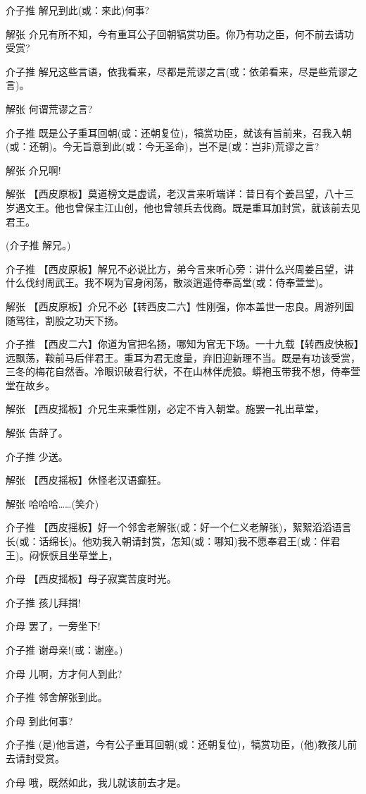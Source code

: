 介子推 解兄到此(或：来此)何事?

解张
介兄有所不知，今有重耳公子回朝犒赏功臣。你乃有功之臣，何不前去请功受赏?

介子推
解兄这些言语，依我看来，尽都是荒谬之言(或：依弟看来，尽是些荒谬之言)。

解张 何谓荒谬之言?

介子推
既是公子重耳回朝(或：还朝复位)，犒赏功臣，就该有旨前来，召我入朝(或：还朝)。今无旨意到此(或：今无圣命)，岂不是(或：岂非)荒谬之言?

解张 介兄啊!

解张
【西皮原板】莫道榜文是虚谎，老汉言来听端详：昔日有个姜吕望，八十三岁遇文王。他也曾保主江山创，他也曾领兵去伐商。既是重耳加封赏，就该前去见君王。

(介子推 解兄。)

介子推
【西皮原板】解兄不必说比方，弟今言来听心旁：讲什么兴周姜吕望，讲什么伐纣周武王。我不啊为官身闲荡，散淡逍遥侍奉高堂(或：侍奉萱堂)。

解张
【西皮原板】介兄不必【转西皮二六】性刚强，你本盖世一忠良。周游列国随驾往，割股之功天下扬。

介子推
【西皮二六】你道为官把名扬，哪知为官无下场。一十九载【转西皮快板】远飘荡，鞍前马后伴君王。重耳为君无度量，弃旧迎新理不当。既是有功该受赏，三冬的梅花自然香。冷眼识破君行状，不在山林伴虎狼。蟒袍玉带我不想，侍奉萱堂在故乡。

解张 【西皮摇板】介兄生来秉性刚，必定不肯入朝堂。施罢一礼出草堂，

解张 告辞了。

介子推 少送。

解张 【西皮摇板】休怪老汉语癫狂。

解张 哈哈哈\ldots{}\ldots{}(笑介)

介子推
【西皮摇板】好一个邻舍老解张(或：好一个仁义老解张)，絮絮滔滔语言长(或：话绵长)。他劝我入朝请封赏，怎知(或：哪知)我不愿奉君王(或：伴君王)。闷恹恹且坐草堂上，

介母 【西皮摇板】母子寂寞苦度时光。

介子推 孩儿拜揖!

介母 罢了，一旁坐下!

介子推 谢母亲!(或：谢座。)

介母 儿啊，方才何人到此?

介子推 邻舍解张到此。

介母 到此何事?

介子推
(是)他言道，今有公子重耳回朝(或：还朝复位)，犒赏功臣，(他)教孩儿前去请封受赏。

介母 哦，既然如此，我儿就该前去才是。

